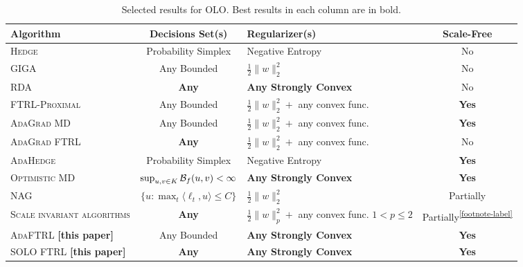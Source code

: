 \renewcommand{\arraystretch}{1.8}

\begin{table}[t]
\fontsize{8}{8.2}\selectfont
\centering
\begin{tabular}{|p{3.6cm}|c|p{3.4cm}|c|}
\hline
\textbf{Algorithm} & \textbf{Decisions Set(s)} & \textbf{Regularizer(s)} & \textbf{Scale-Free} \\ \hline \hline
\textsc{Hedge} \cite{Freund-Schapire-1999} & Probability Simplex & Negative Entropy & No \\ \hline
\textsc{GIGA} \cite{Zinkevich-2003} & Any Bounded & $\frac{1}{2}\|w\|_2^2$ & No \\ \hline
\textsc{RDA} \cite{Xiao-2010} & \textbf{Any} & \textbf{Any Strongly Convex} & No \\ \hline
\textsc{FTRL-Proximal} \cite{McMahan-Streeter-2010,McMahan-2014} & Any Bounded & $\frac{1}{2}\|w\|_2^2 + $ any convex func. & \textbf{Yes} \\ \hline
\textsc{AdaGrad MD} \cite{Duchi-Hazan-Singer-2011} & Any Bounded & $\frac{1}{2}\|w\|_2^2 + $ any convex func. & \textbf{Yes} \\ \hline
\textsc{AdaGrad FTRL} \cite{Duchi-Hazan-Singer-2011} & \textbf{Any} & $\frac{1}{2}\|w\|_2^2 + $ any convex func. & No \\ \hline
\textsc{AdaHedge} \cite{de-Rooij-van-Erven-Grunwald-Koolen-2014} & Probability Simplex & Negative Entropy & \textbf{Yes} \\ \hline
\textsc{Optimistic MD} \cite{Rakhlin-Sridharan-2013} & $\sup_{u,v \in K} \mathcal{B}_f(u,v) < \infty$ & \textbf{Any Strongly Convex} & \textbf{Yes} \\ \hline
\textsc{NAG} \cite{Ross-Mineiro-Langford-2013} & $\{u: \max_t \langle \ell_t, u\rangle \leq C\}$ & $\frac{1}{2}\|w\|_2^2 $& Partially\footnotemark \\ \hline
\textsc{Scale invariant algorithms} \cite{Orabona-Crammer-Cesa-Bianchi-2014} & \textbf{Any} & $\frac{1}{2}\|w\|_p^2 + $ any convex func. \newline $1<p\leq2$ & Partially\textsuperscript{\ref{footnote-label}} \\ \hline
\textsc{AdaFTRL} \textbf{[this paper]} & Any Bounded & \textbf{Any Strongly Convex} & \textbf{Yes} \\ \hline
\textsc{SOLO FTRL} \textbf{[this paper]} & \textbf{Any} & \textbf{Any Strongly Convex} & \textbf{Yes} \\ \hline
\end{tabular}
\caption{Selected results for OLO. Best results in each column are in bold.
\label{table:results}
}
\end{table}

